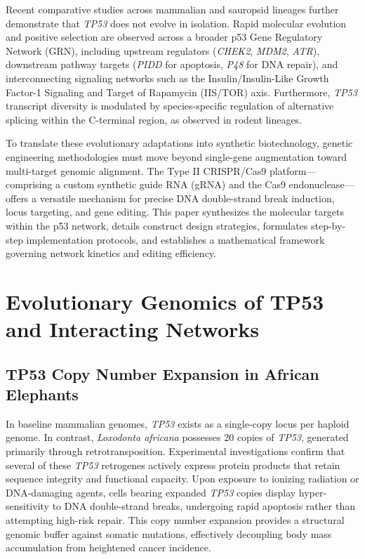 \documentclass[11pt,a4paper]{article}
\begin{document}
Recent comparative studies across mammalian and sauropsid lineages further demonstrate that \textit{TP53} does not evolve in isolation. Rapid molecular evolution and positive selection are observed across a broader p53 Gene Regulatory Network (GRN), including upstream regulators (\textit{CHEK2}, \textit{MDM2}, \textit{ATR}), downstream pathway targets (\textit{PIDD} for apoptosis, \textit{P48} for DNA repair), and interconnecting signaling networks such as the Insulin/Insulin-Like Growth Factor-1 Signaling and Target of Rapamycin (IIS/TOR) axis. Furthermore, \textit{TP53} transcript diversity is modulated by species-specific regulation of alternative splicing within the C-terminal region, as observed in rodent lineages.

To translate these evolutionary adaptations into synthetic biotechnology, genetic engineering methodologies must move beyond single-gene augmentation toward multi-target genomic alignment. The Type II CRISPR/Cas9 platform—comprising a custom synthetic guide RNA (gRNA) and the Cas9 endonuclease—offers a versatile mechanism for precise DNA double-strand break induction, locus targeting, and gene editing. This paper synthesizes the molecular targets within the p53 network, details construct design strategies, formulates step-by-step implementation protocols, and establishes a mathematical framework governing network kinetics and editing efficiency.

\section{Evolutionary Genomics of TP53 and Interacting Networks}

\subsection{TP53 Copy Number Expansion in African Elephants}
In baseline mammalian genomes, \textit{TP53} exists as a single-copy locus per haploid genome. In contrast, \textit{Loxodonta africana} possesses 20 copies of \textit{TP53}, generated primarily through retrotransposition. Experimental investigations confirm that several of these \textit{TP53} retrogenes actively express protein products that retain sequence integrity and functional capacity. Upon exposure to ionizing radiation or DNA-damaging agents, cells bearing expanded \textit{TP53} copies display hyper-sensitivity to DNA double-strand breaks, undergoing rapid apoptosis rather than attempting high-risk repair. This copy number expansion provides a structural genomic buffer against somatic mutations, effectively decoupling body mass accumulation from heightened cancer incidence.
\end{document}
